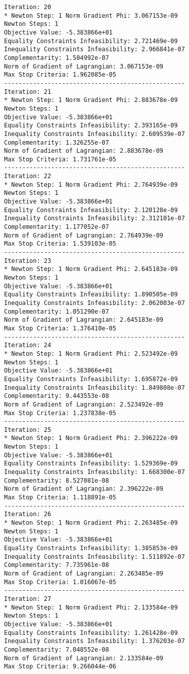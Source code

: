 \documentclass{article}
\begin{document}
\begin{minipage}[t]{0.45\textwidth}
\begin{verbatim}
Iteration: 20
* Newton Step: 1 Norm Gradient Phi: 3.067153e-09
Newton Steps: 1
Objective Value: -5.383866e+01
Equality Constraints Infeasibility: 2.721469e-09
Inequality Constraints Infeasibility: 2.966841e-07
Complementarity: 1.504992e-07
Norm of Gradient of Lagrangian: 3.067153e-09
Max Stop Criteria: 1.962085e-05
--------------------------------------------------
Iteration: 21
* Newton Step: 1 Norm Gradient Phi: 2.883678e-09
Newton Steps: 1
Objective Value: -5.383866e+01
Equality Constraints Infeasibility: 2.393165e-09
Inequality Constraints Infeasibility: 2.609539e-07
Complementarity: 1.326255e-07
Norm of Gradient of Lagrangian: 2.883678e-09
Max Stop Criteria: 1.731761e-05
--------------------------------------------------
Iteration: 22
* Newton Step: 1 Norm Gradient Phi: 2.764939e-09
Newton Steps: 1
Objective Value: -5.383866e+01
Equality Constraints Infeasibility: 2.120128e-09
Inequality Constraints Infeasibility: 2.312101e-07
Complementarity: 1.177052e-07
Norm of Gradient of Lagrangian: 2.764939e-09
Max Stop Criteria: 1.539103e-05
--------------------------------------------------
Iteration: 23
* Newton Step: 1 Norm Gradient Phi: 2.645183e-09
Newton Steps: 1
Objective Value: -5.383866e+01
Equality Constraints Infeasibility: 1.890505e-09
Inequality Constraints Infeasibility: 2.062003e-07
Complementarity: 1.051290e-07
Norm of Gradient of Lagrangian: 2.645183e-09
Max Stop Criteria: 1.376410e-05
--------------------------------------------------
Iteration: 24
* Newton Step: 1 Norm Gradient Phi: 2.523492e-09
Newton Steps: 1
Objective Value: -5.383866e+01
Equality Constraints Infeasibility: 1.695872e-09
Inequality Constraints Infeasibility: 1.849808e-07
Complementarity: 9.443553e-08
Norm of Gradient of Lagrangian: 2.523492e-09
Max Stop Criteria: 1.237838e-05
--------------------------------------------------
Iteration: 25
* Newton Step: 1 Norm Gradient Phi: 2.396222e-09
Newton Steps: 1
Objective Value: -5.383866e+01
Equality Constraints Infeasibility: 1.529369e-09
Inequality Constraints Infeasibility: 1.668300e-07
Complementarity: 8.527081e-08
Norm of Gradient of Lagrangian: 2.396222e-09
Max Stop Criteria: 1.118891e-05
--------------------------------------------------
Iteration: 26
* Newton Step: 1 Norm Gradient Phi: 2.263485e-09
Newton Steps: 1
Objective Value: -5.383866e+01
Equality Constraints Infeasibility: 1.385853e-09
Inequality Constraints Infeasibility: 1.511892e-07
Complementarity: 7.735961e-08
Norm of Gradient of Lagrangian: 2.263485e-09
Max Stop Criteria: 1.016067e-05
--------------------------------------------------
Iteration: 27
* Newton Step: 1 Norm Gradient Phi: 2.133584e-09
Newton Steps: 1
Objective Value: -5.383866e+01
Equality Constraints Infeasibility: 1.261428e-09
Inequality Constraints Infeasibility: 1.376203e-07
Complementarity: 7.048552e-08
Norm of Gradient of Lagrangian: 2.133584e-09
Max Stop Criteria: 9.266044e-06
\end{verbatim}
\end{minipage}
\end{document}
